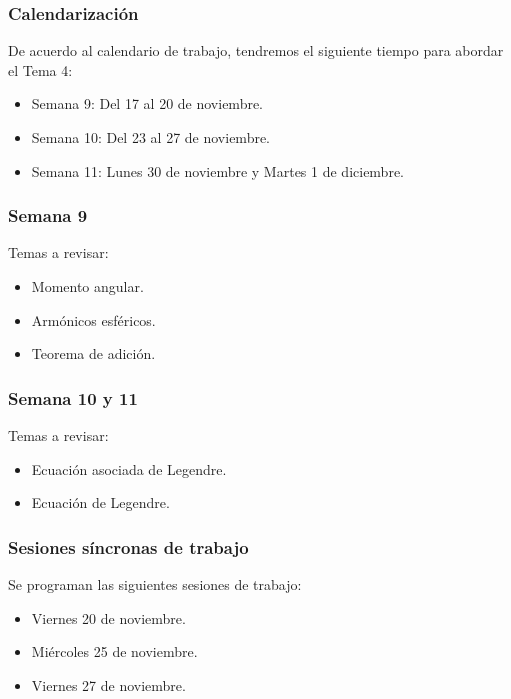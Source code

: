 \documentclass[12pt]{beamer}
\begin{document}
\begin{frame}
\frametitle{Calendarización}
De acuerdo al calendario de trabajo, tendremos el siguiente tiempo para abordar el Tema 4:
\begin{itemize}
\item Semana 9: Del 17 al 20 de noviembre.
\item Semana 10: Del 23 al 27 de noviembre.
\item Semana 11:  Lunes 30 de noviembre y Martes 1 de diciembre.
\end{itemize}
\end{frame}
\begin{frame}
\frametitle{Semana 9}
Temas a revisar:
\begin{itemize}
\item Momento angular.
\item Armónicos esféricos.
\item Teorema de adición.
\end{itemize}
\end{frame}
\begin{frame}
\frametitle{Semana 10 y 11}
Temas a revisar:
\begin{itemize}
\item Ecuación asociada de Legendre.
\item Ecuación de Legendre.
\end{itemize}
\end{frame}
\begin{frame}
\frametitle{Sesiones síncronas de trabajo}
Se programan las siguientes sesiones de trabajo:
\begin{itemize}
\item Viernes 20 de noviembre.
\item Miércoles 25 de noviembre.
\item Viernes 27 de noviembre.
\end{itemize}
\end{frame}
\end{document}
